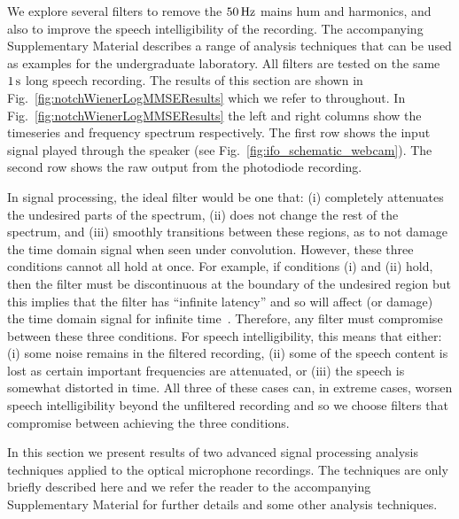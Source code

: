 \documentclass[paper-main.tex]{subfiles}
\begin{document}
We explore several filters to remove the $50\,{\rm Hz}$ mains hum and harmonics, and also to improve the speech intelligibility of the recording.
The accompanying Supplementary Material describes a range of analysis techniques that can be used as examples for the undergraduate laboratory. 
All filters are tested on the same $1\,{\rm s}$ long speech recording.
The results of this section are shown in Fig.~\ref{fig:notchWienerLogMMSEResults} which we refer to throughout. 
In Fig.~\ref{fig:notchWienerLogMMSEResults} the left and right columns show the timeseries and frequency spectrum respectively. 
The first row shows the input signal played through the speaker (see Fig.~\ref{fig:ifo_schematic_webcam}). 
The second row shows the raw output from the photodiode recording. 



In signal processing, the ideal filter would be one that:
(i) completely attenuates the undesired parts of the spectrum, 
(ii) does not change the rest of the spectrum, and 
(iii) smoothly transitions between these regions, as to not damage the time domain signal when seen under convolution. 
However, these three conditions cannot all hold at once. For example, if conditions (i) and (ii) hold, then the filter must be discontinuous at the boundary of the undesired region but this implies that the filter has ``infinite latency'' and so will affect (or damage) the time domain signal for infinite time~\cite{10.5555/151045}. Therefore, any filter must compromise between these three conditions. For speech intelligibility, this means that either: (i) some noise remains in the filtered recording, (ii) some of the speech content is lost as certain important frequencies are attenuated, or (iii) the speech is somewhat distorted in time. All three of these cases can, in extreme cases, worsen speech intelligibility beyond the unfiltered recording and so we choose filters that compromise between achieving the three conditions.


In this section we present results of two advanced signal processing analysis techniques applied to the optical microphone recordings. 
The techniques are only briefly described here and we refer the reader to the accompanying Supplementary Material for further details and some other analysis techniques. 
\end{document}
